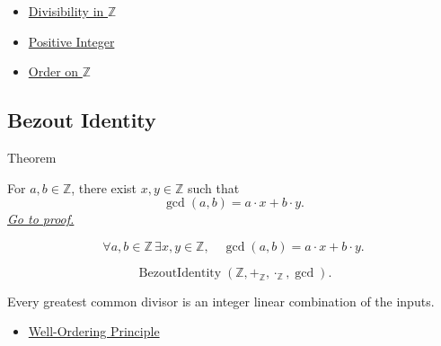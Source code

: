 \begin{dependencies}
\begin{itemize}
  \item \hyperref[def:divisibility-in-z]{Divisibility in $\mathbb{Z}$}
  \item \hyperref[def:positive-integer]{Positive Integer}
  \item \hyperref[def:order-on-z]{Order on $\mathbb{Z}$}
\end{itemize}
\end{dependencies}

\subsection*{Bezout Identity}

\begin{theorembox}{Theorem}
\begin{theorem}
\label{thm:bezout-identity-on-z}
For $a,b\in\mathbb{Z}$, there exist $x,y\in\mathbb{Z}$ such that
\[
\gcd(a,b)=a\cdot x+b\cdot y.
\]
\hyperref[prf:bezout-identity-on-z]{\textit{Go to proof.}}
\end{theorem}
\end{theorembox}

\begin{remark*}
\[
\forall a,b\in\mathbb{Z}\,\exists x,y\in\mathbb{Z},\quad
\gcd(a,b)=a\cdot x+b\cdot y.
\]
\end{remark*}

\begin{remark*}
\[
\operatorname{BezoutIdentity}(\mathbb{Z},+_{\mathbb{Z}},\cdot_{\mathbb{Z}},\gcd).
\]
\end{remark*}

\begin{remark*}[Interpretation]
Every greatest common divisor is an integer linear combination of the inputs.
\end{remark*}

\begin{dependencies}
\begin{itemize}
  \item \hyperref[thm:well-ordering-principle]{Well-Ordering Principle}
\end{itemize}
\end{dependencies}

